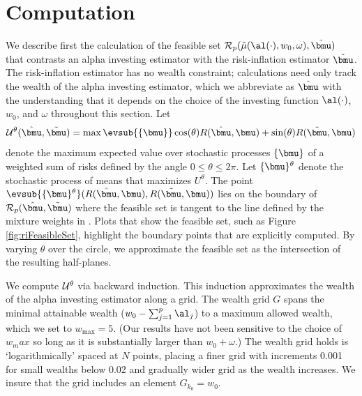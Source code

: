 \documentclass[12pt]{article}
\begin{document}





\section{ Computation }


 We describe first the calculation of the feasible set ${\cal R}_p(\hat\mu(
 \al(\cdot), w_0, \omega), \tilde{\bmu})$ that contrasts an alpha investing
 estimator with the risk-inflation estimator $\tilde{\bmu}$.  The risk-inflation
 estimator has no wealth constraint; calculations need only track the wealth of
 the alpha investing estimator, which we abbreviate as $\hat{\bmu}$ with the
 understanding that it depends on the choice of the investing function
 $\al(\cdot)$, $w_0$, and $\omega$ throughout this section.  Let
 \begin{equation}
   {\cal U}^\theta(\hat{\bmu},\tilde{\bmu}) = 
       \max \evsub{\{\bmu\}} 
       \cos(\theta) R(\hat{\bmu}, \bmu) + \sin(\theta) R(\tilde{\bmu},\bmu) 
 \label{eq:U}
 \end{equation}
 denote the maximum expected value over stochastic processes $\{\bmu\}$ of a
 weighted sum of risks defined by the angle $ 0 \le \theta \le 2 \pi$.  Let
 $\{\bmu\}^\theta$ denote the stochastic process of means that maximizes
 $U^\theta$.  The point $\evsub{\{\bmu\}^\theta}(R(\hat{\bmu}, \bmu),
 R(\tilde{\bmu}, \bmu))$ lies on the boundary of ${\cal
 R}_p(\hat{\bmu},\tilde{\bmu})$ where the feasible set is tangent to the line
 defined by the mixture weights in .  Plots that show the feasible
 set, such as Figure \ref{fig:riFeasibleSet}, highlight the boundary points that
 are explicitly computed.  By varying $\theta$ over the circle, we approximate
 the feasible set as the intersection of the resulting half-planes.

 
 We compute ${\cal U}^\theta$ via backward induction.  This induction
 approximates the wealth of the alpha investing estimator along a grid.  The
 wealth grid $G$ spans the minimal attainable wealth ($w_0 - \sum_{j=1}^p
 \al_j$) to a maximum allowed wealth, which we set to $w_{\max} = 5$.  (Our
 results have not been sensitive to the choice of $w_max$ so long as it is
 substantially larger than $w_0 + \omega$.)  The wealth grid holds is
 `logarithmically' spaced at $N$ points, placing a finer grid with increments
 0.001 for small wealths below 0.02 and gradually wider grid as the wealth
 increases.  We insure that the grid includes an element $G_{k_0} = w_0$.  
\end{document}
